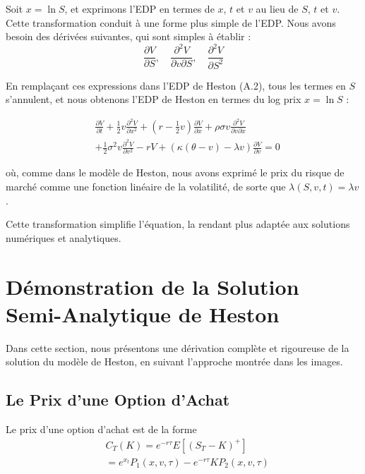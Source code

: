 Soit $x = \ln S$, et exprimons l'EDP en termes de $x$, $t$ et $v$ au lieu de $S$, $t$ et $v$.
Cette transformation conduit à une forme plus simple de l'EDP. Nous avons besoin des dérivées suivantes, qui sont simples à établir :
\begin{equation}
    \frac{\partial V}{\partial S}, \quad \frac{\partial^2 V}{\partial v \partial S}, \quad \frac{\partial^2 V}{\partial S^2}
\end{equation}

En remplaçant ces expressions dans l'EDP de Heston (A.2), tous les termes en $S$ s'annulent, et nous obtenons l'EDP de Heston en termes du log prix $x = \ln S$ :

\begin{equation} \label{heston edp log}
\begin{split}
& \frac{\partial V}{\partial t} + \frac{1}{2} v \frac{\partial^2 V}{\partial x^2} + \left(r - \frac{1}{2} v\right) \frac{\partial V}{\partial x} + \rho \sigma v \frac{\partial^2 V}{\partial v \partial x} \\
&  + \frac{1}{2} \sigma^2 v \frac{\partial^2 V}{\partial v^2} - rV + \left(\kappa (\theta - v) - \lambda v\right) \frac{\partial V}{\partial v} = 0
 \end{split}
\end{equation}

où, comme dans le modèle de Heston, nous avons exprimé le prix du risque de marché comme une fonction linéaire de la volatilité, de sorte que $\lambda(S, v, t) = \lambda v$.

Cette transformation simplifie l'équation, la rendant plus adaptée aux solutions numériques et analytiques.



\section{Démonstration de la Solution Semi-Analytique de Heston}
\label{app:heston semiAnalytique}

Dans cette section, nous présentons une dérivation complète et rigoureuse de la solution du modèle de Heston, en suivant l'approche montrée dans les images.

\subsection{Le Prix d'une Option d'Achat}

Le prix d'une option d'achat est de la forme
\begin{equation}
\begin{split}
& C_T(K) = e^{-r\tau}E\left[(S_T - K)^+\right]\\
& = e^{x_t}P_1(x,v,\tau) - e^{-r\tau}KP_2(x,v,\tau)
\end{split}
\end{equation}


